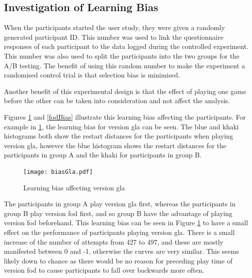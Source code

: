 \documentclass[12pt,a4paper,twoside,openright]{report}
\begin{document}
\subsection{Investigation of Learning Bias}
\label{learningBias}

When the participants started the user study, they were given a randomly generated participant ID. This number was used to link the questionnaire responses of each participant to the data logged during the controlled experiment. 
This number was also used to split the participants into the two groups for the A/B testing.
The benefit of using this random number to make the experiment a randomised control trial is that selection bias is minimised.

Another benefit of this experimental design is that the effect of playing one game before the other can be taken into consideration and not affect the analysis.

Figures \ref{glaBias} and \ref{fodBias} illustrate this learning bias affecting the participants.
For example in \ref{glaBias}, the learning bias for version gla can be seen.
The blue and khaki histograms both show the restart distances for the participants when playing version gla, however the blue histogram shows the restart distances for the participants in group A and the khaki for participants in group B.

\begin{figure}
\centerline{\texttt{[image: biasGla.pdf]}}
\caption{Learning bias affecting version gla}
\label{glaBias}
\end{figure}

The participants in group A play version gla first, whereas the participants in group B play version fod first, and so group B have the advantage of playing version fod beforehand.
This learning bias can be seen in Figure \ref{glaBias} to have a small effect on the performance of participants playing version gla. There is a small increase of the number of attempts from 427 to 497, and these are mostly manifested between 0 and -1, otherwise the curves are very similar.
This seems likely down to chance as there would be no reason for preceding play time of version fod to cause participants to fall over backwards more often.
\end{document}
